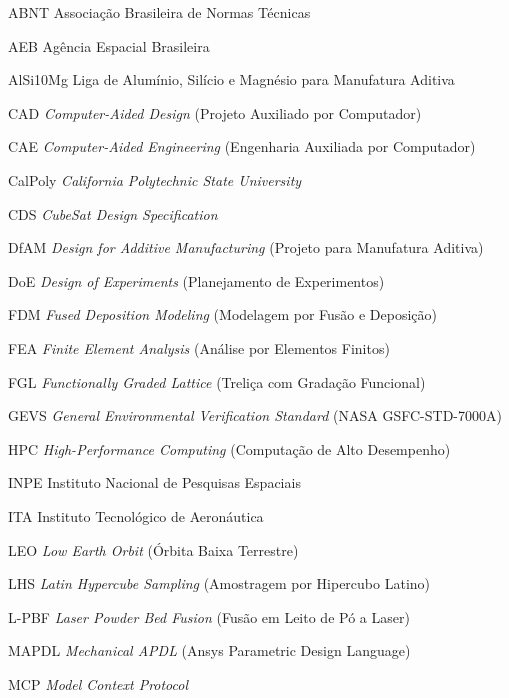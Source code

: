 
\begin{siglas}
  \item[ABNT] Associação Brasileira de Normas Técnicas
  \item[AEB] Agência Espacial Brasileira
  \item[AlSi10Mg] Liga de Alumínio, Silício e Magnésio para Manufatura Aditiva
  \item[CAD] \textit{Computer-Aided Design} (Projeto Auxiliado por Computador)
  \item[CAE] \textit{Computer-Aided Engineering} (Engenharia Auxiliada por Computador)
  \item[CalPoly] \textit{California Polytechnic State University}
  \item[CDS] \textit{CubeSat Design Specification}
  \item[DfAM] \textit{Design for Additive Manufacturing} (Projeto para Manufatura Aditiva)
  \item[DoE] \textit{Design of Experiments} (Planejamento de Experimentos)
  \item[FDM] \textit{Fused Deposition Modeling} (Modelagem por Fusão e Deposição)
  \item[FEA] \textit{Finite Element Analysis} (Análise por Elementos Finitos)
  \item[FGL] \textit{Functionally Graded Lattice} (Treliça com Gradação Funcional)
  \item[GEVS] \textit{General Environmental Verification Standard} (NASA GSFC-STD-7000A)
  \item[HPC] \textit{High-Performance Computing} (Computação de Alto Desempenho)
  \item[INPE] Instituto Nacional de Pesquisas Espaciais
  \item[ITA] Instituto Tecnológico de Aeronáutica
  \item[LEO] \textit{Low Earth Orbit} (Órbita Baixa Terrestre)
  \item[LHS] \textit{Latin Hypercube Sampling} (Amostragem por Hipercubo Latino)
  \item[L-PBF] \textit{Laser Powder Bed Fusion} (Fusão em Leito de Pó a Laser)
  \item[MAPDL] \textit{Mechanical APDL} (Ansys Parametric Design Language)
  \item[MCP] \textit{Model Context Protocol}

\end{siglas}
